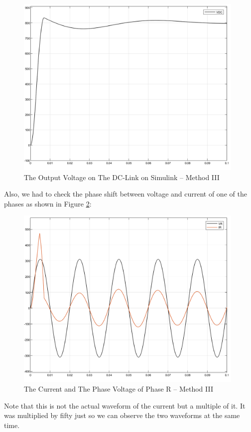 \documentclass[12pt,a4paper]{book}
\begin{document}
\begin{figure}[h!]
  \centering
  \includegraphics[width=11cm]{image24.png}
  \caption{The Output Voltage on The DC-Link on Simulink -- Method III}
  \label{fig:image24}
\end{figure}
Also, we had to check the phase shift between voltage and current of one of the phases as shown in Figure \ref{fig:image25}:

\begin{figure}[h!]
  \centering
  \includegraphics[width=11cm]{image25.png}
  \caption{The Current and The Phase Voltage of Phase R -- Method III}
  \label{fig:image25}
\end{figure}
Note that this is not the actual waveform of the current but a multiple of it. It was multiplied by fifty just so we can observe the two waveforms at the same time.
\end{document}
